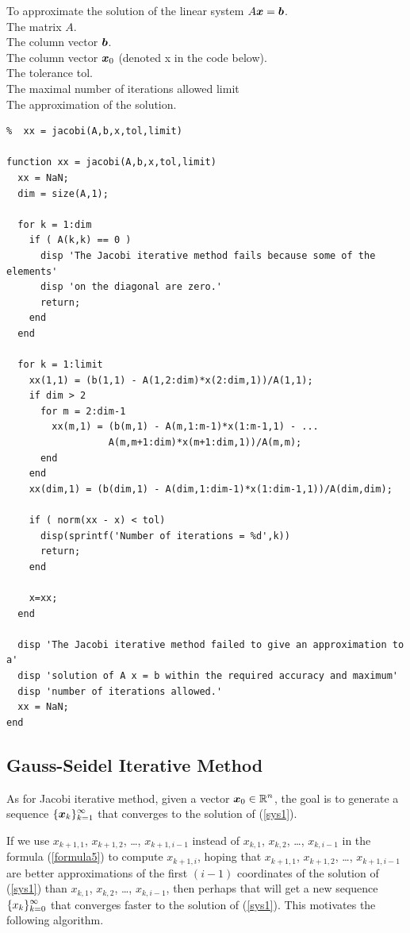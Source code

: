 \begin{code}
To approximate the solution of the linear system $A \bm{x} = \bm{b}$.\\
 The matrix $A$.\\
The column vector $\bm{b}$.\\
The column vector $\bm{x}_0$ (denoted x in the code below).\\
The tolerance  tol.\\
The maximal number of iterations allowed  limit\\
 The approximation of the solution.
\small
\begin{verbatim}
%  xx = jacobi(A,b,x,tol,limit)

function xx = jacobi(A,b,x,tol,limit)
  xx = NaN;
  dim = size(A,1);

  for k = 1:dim
    if ( A(k,k) == 0 )
      disp 'The Jacobi iterative method fails because some of the elements'
      disp 'on the diagonal are zero.'
      return;
    end
  end

  for k = 1:limit
    xx(1,1) = (b(1,1) - A(1,2:dim)*x(2:dim,1))/A(1,1);
    if dim > 2
      for m = 2:dim-1
        xx(m,1) = (b(m,1) - A(m,1:m-1)*x(1:m-1,1) - ...
                  A(m,m+1:dim)*x(m+1:dim,1))/A(m,m);
      end
    end
    xx(dim,1) = (b(dim,1) - A(dim,1:dim-1)*x(1:dim-1,1))/A(dim,dim);

    if ( norm(xx - x) < tol)
      disp(sprintf('Number of iterations = %d',k))
      return;
    end

    x=xx;
  end

  disp 'The Jacobi iterative method failed to give an approximation to a'
  disp 'solution of A x = b within the required accuracy and maximum'
  disp 'number of iterations allowed.'
  xx = NaN;
end
\end{verbatim}
\end{code}

\subsection{Gauss-Seidel Iterative Method}

As for Jacobi iterative method, given a vector
$\displaystyle \bm{x}_{0} \in \mathbb{R}^n$, the goal is to generate a sequence
$\displaystyle \{\bm{x}_{k}\}_{k=1}^\infty$ that converges to the
solution of (\ref{sys1}).

If we use $x_{k+1,1}$, $x_{k+1,2}$, \ldots , $x_{k+1,i-1}$
instead of $x_{k,1}$, $x_{k,2}$, \ldots , $x_{k,i-1}$ in the formula
(\ref{formula5}) to compute $x_{k+1,i}$, hoping that $x_{k+1,1}$, 
$x_{k+1,2}$, \ldots , $x_{k+1,i-1}$ are better
approximations of the first $(i-1)$ coordinates of the solution of
(\ref{sys1}) than $x_{k,1}$, $x_{k,2}$, \ldots ,
$x_{k,i-1}$, then perhaps that will get a new sequence
$\displaystyle \{x_k\}_{k=0}^\infty$ that converges faster to the solution of
(\ref{sys1}).  This motivates the following algorithm.

